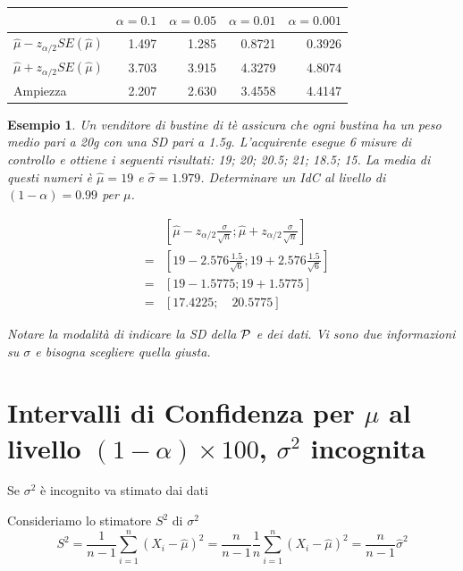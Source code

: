 \documentclass[
  11pt,
]{book}
\theoremstyle{mytheoremstyle}
\theoremstyle{mydefstyle}
\newtheorem{example}{{Esempio}}[section]
\begin{document}
\begin{tabular}{lrrrr}
\toprule
  & $\alpha=0.1$ & $\alpha=0.05$ & $\alpha=0.01$ & $\alpha=0.001$\\
\midrule
$\hat \mu - z_{\alpha/2}SE(\hat \mu)$ & 1.497 & 1.285 & 0.8721 & 0.3926\\
$\hat \mu + z_{\alpha/2}SE(\hat \mu)$ & 3.703 & 3.915 & 4.3279 & 4.8074\\
Ampiezza & 2.207 & 2.630 & 3.4558 & 4.4147\\
\bottomrule
\end{tabular}

\begin{example}
Un venditore di bustine di tè assicura che ogni bustina ha un
peso medio pari a 20g con una SD pari a 1.5g.
L'acquirente esegue 6 misure di controllo e ottiene i seguenti
risultati: 19; 20; 20.5; 21; 18.5; 15.
La media di questi numeri è \(\hat\mu = 19\) e \(\widehat{\sigma}=1.979\).
Determinare un IdC al livello di \((1-\alpha)=0.99\) per \(\mu\).

\begin{eqnarray*}
& & \left[\hat\mu -z_{\alpha/2} \frac{\sigma} {\sqrt{n}};
          \hat\mu +z_{\alpha/2} \frac{\sigma} {\sqrt{n}} \right] \\
&=& \left[ 19 -2.576 \frac{1.5} {\sqrt{6}}; 19 +2.576 \frac{1.5} {\sqrt{6}} \right] \\
&=& \left[ 19 - 1.5775; 19 + 1.5775 \right]        \\
&=& \left[ 17.4225;\quad 20.5775 \right]
\end{eqnarray*}

Notare la modalità di indicare la SD della \(\cal{P}\) e dei dati.
Vi sono due informazioni su \(\sigma\) e bisogna scegliere quella giusta.
\end{example}

\section{\texorpdfstring{Intervalli di Confidenza per \(\mu\) al livello \((1-\alpha)\times 100\), \(\sigma^2\) incognita}{Intervalli di Confidenza per \textbackslash mu al livello (1-\textbackslash alpha)\textbackslash times 100, \textbackslash sigma\^{}2 incognita}}\label{intervalli-di-confidenza-per-mu-al-livello-1-alphatimes-100-sigma2-incognita}

Se \(\sigma^2\) è incognito va stimato dai dati

Consideriamo lo stimatore \(S^2\) di \(\sigma^2\)
\[S^2=\frac {1}{n-1}\sum_{i=1}^n (X_i-\hat \mu)^2=\frac {n}{n-1}\frac 1 n\sum_{i=1}^n (X_i-\hat \mu)^2=\frac n {n-1}\hat\sigma^2\]
\end{document}
